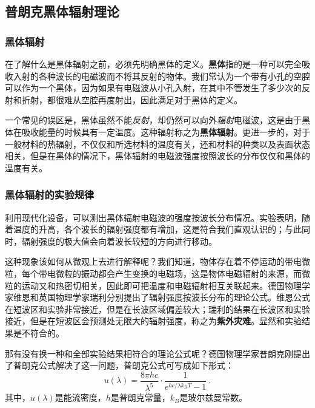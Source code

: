 


\subsection{普朗克黑体辐射理论}
\subsubsection{黑体辐射}
在了解什么是黑体辐射之前，必须先明确黑体的定义。\textbf{黑体}指的是一种可以完全吸收入射的各种波长的电磁波而不将其反射的物体。我们常认为一个带有小孔的空腔可以作为一个黑体，因为如果有电磁波从小孔入射，在其中不管发生了多少次的反射和折射，都很难从空腔再度射出，因此满足对于黑体的定义。

一个常见的误区是，黑体虽然不能\textsl{反射}，却仍然可以向外\textsl{辐射}电磁波，这是由于黑体在吸收能量的时候具有一定温度。这种辐射称之为\textbf{黑体辐射}。更进一步的，对于一般材料的热辐射，不仅仅和所选材料的温度有关，还和材料的种类以及表面状态相关，但是在黑体的情况下，黑体辐射的电磁波强度按照波长的分布仅仅和黑体的温度有关。

\subsubsection{黑体辐射的实验规律}
利用现代化设备，可以测出黑体辐射电磁波的强度按波长分布情况。实验表明，随着温度的升高，各个波长的辐射强度都有增加，这是符合我们直观认识的；与此同时，辐射强度的极大值会向着波长较短的方向进行移动。

这种现象该如何从微观上去进行解释呢？我们知道，物体存在着不停运动的带电微粒，每个带电微粒的振动都会产生变换的电磁场，这是物体电磁辐射的来源，而微粒的运动又和热密切相关，因此即可把温度和电磁辐射相互关联起来。德国物理学家维恩和英国物理学家瑞利分别提出了辐射强度按波长分布的理论公式。维恩公式在短波区和实验非常接近，但是在长波区域偏差较大；瑞利的结果在长波区和实验接近，但是在短波区会预测处无限大的辐射强度，称之为\textbf{紫外灾难}。显然和实验结果是不符合的。

那有没有换一种和全部实验结果相符合的理论公式呢？德国物理学家普朗克刚提出了普朗克公式解决了这一问题，普朗克公式可写成如下形式：
$$u(\lambda)=\dfrac{8\pi hc}{\lambda^5}\cdot\dfrac{1}{e^{hc/\lambda k_BT}-1}~.$$其中，$u(\lambda)$是能流密度，$h$是普朗克常量，$k_B$是玻尔兹曼常数。

